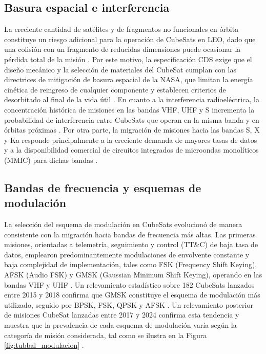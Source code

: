 \subsection{Basura espacial e interferencia} \label{subsec:basura_espacial}
La creciente cantidad de satélites y de fragmentos no funcionales en órbita constituye un riesgo adicional para la operación de CubeSats en LEO, dado que una colisión con un fragmento de reducidas dimensiones puede ocasionar la pérdida total de la misión \cite{tubbal2025}. Por este motivo, la especificación CDS exige que el diseño mecánico y la selección de materiales del CubeSat cumplan con las directrices de mitigación de basura espacial de la NASA, que limitan la energía cinética de reingreso de cualquier componente y establecen criterios de desorbitado al final de la vida útil \cite{cubesatspecs}. En cuanto a la interferencia radioeléctrica, la concentración histórica de misiones en las bandas VHF, UHF y S incrementa la probabilidad de interferencia entre CubeSats que operan en la misma banda y en órbitas próximas \cite{tubbal2025}. Por otra parte, la migración de misiones hacia las bandas S, X y Ka responde principalmente a la creciente demanda de mayores tasas de datos y a la disponibilidad comercial de circuitos integrados de microondas monolíticos (MMIC) para dichas bandas \cite{zeedan2023}.

\subsection{Bandas de frecuencia y esquemas de modulación}
La selección del esquema de modulación en CubeSats evolucionó de manera consistente con la migración hacia bandas de frecuencia más altas. Las primeras misiones, orientadas a telemetría, seguimiento y control (TT\&C) de baja tasa de datos, emplearon predominantemente modulaciones de envolvente constante y baja complejidad de implementación, tales como FSK (Frequency Shift Keying), AFSK (Audio FSK) y GMSK (Gaussian Minimum Shift Keying), operando en las bandas VHF y UHF \cite{zeedan2023, tubbal2025}. Un relevamiento estadístico sobre 182 CubeSats lanzados entre 2015 y 2018 confirma que GMSK constituye el esquema de modulación más utilizado, seguido por BPSK, FSK, QPSK y AFSK \cite{zeedan2023}. Un relevamiento posterior de misiones CubeSat lanzadas entre 2017 y 2024 confirma esta tendencia y muestra que la prevalencia de cada esquema de modulación varía según la categoría de misión considerada, tal como se ilustra en la Figura \ref{fig:tubbal_modulacion} \cite{tubbal2025}.
 
